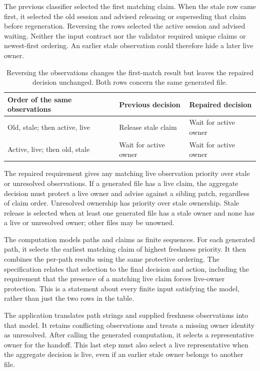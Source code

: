 \documentclass[11pt]{article}
\begin{document}
The previous classifier selected the first matching claim. When the stale row
came first, it selected the old session and advised releasing or superseding
that claim before regeneration. Reversing the rows selected the active session
and advised waiting. Neither the input contract nor the validator required
unique claims or newest-first ordering. An earlier stale observation could
therefore hide a later live owner.

\begin{table}[htbp]
\centering
\small
\begin{tabular}{@{}p{.34\linewidth}p{.26\linewidth}p{.31\linewidth}@{}}
\toprule
Order of the same observations & Previous decision & Repaired decision \\
\midrule
Old, stale; then active, live & Release stale claim & Wait for active owner \\
Active, live; then old, stale & Wait for active owner & Wait for active owner \\
\bottomrule
\end{tabular}
\caption{Reversing the observations changes the first-match result but leaves the
repaired decision unchanged. Both rows concern the same generated file.}
\label{tab:ownership}
\end{table}

The repaired requirement gives any matching live observation priority over stale
or unresolved observations. If a generated file has a live claim, the aggregate
decision must protect a live owner and advise against a sibling patch, regardless
of claim order. Unresolved ownership has priority over stale ownership. Stale
release is selected when at least one generated file has a stale owner and none
has a live or unresolved owner; other files may be unowned.

The computation models paths and claims as finite sequences. For each generated
path, it selects the earliest matching claim of highest freshness priority.
It then combines the per-path results using the same protective ordering. The
specification relates that selection to the final decision and action, including
the requirement that the presence of a matching live claim forces live-owner
protection. This is a statement about every finite input satisfying the model,
rather than just the two rows in the table.

The application translates path strings and supplied freshness observations into
that model. It retains conflicting observations and treats a missing owner
identity as unresolved. After calling the generated computation, it selects a
representative owner for the handoff. This last step must also select a live
representative when the aggregate decision is live, even if an earlier stale
owner belongs to another file.
\end{document}
